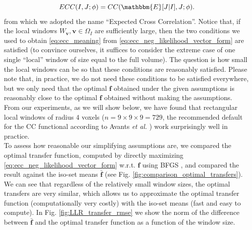 \begin{equation}\label{eq:ecc_meaning}
    ECC(I, J; \phi) = CC(\mathbbm{E}[J|I], J ; \phi).
\end{equation}
from which we adopted the name ``Expected Cross Correlation''. Notice that, if the local windows $W_{\mathbf{v}}, \mathbf{v}\in\Omega_{I}$ are sufficiently large, then the two conditions we used to obtain \eqref{eq:ecc_meaning} from \eqref{eq:ecc_neg_likelihood_vector_form} are satisfied (to convince ourselves, it suffices to consider the extreme case of one single ``local'' window of size equal to the full volume). The question is how small the local windows can be so that these conditions are reasonably satisfied. Please note that, in practice, we do not need these conditions to be satisfied everywhere, but we only need that the optimal $\mathbf{f}$ obtained under the given assumptions is reasonably close to the optimal $\mathbf{f}$ obtained without making the assumptions. From our experiments, as we will show below, we have found that rectangular local windows of radius $4$ voxels ($n=9\times 9\times 9 = 729$, the recommended default for the CC functional according to Avants {\it et al.} \cite{Avants2011}) work surprisingly well in practice.\\

To assess how reasonable our simplifying assumptions are, we compared the optimal transfer function, computed by directly maximizing \eqref{eq:ecc_neg_likelihood_vector_form} w.r.t. $\mathbf{f}$ using BFGS \cite{GVK502988711}, and compared the result against the iso-set means $\mathbf{\bar{f}}$ (see Fig. \ref{fig:comparison_optimal_transfers}). We can see that regardless of the relatively small window sizes, the optimal transfers are very similar, which allows us to approximate the optimal transfer function (computationally very costly) with the iso-set means (fast and easy to compute). In Fig. \ref{fig:LLR_transfer_rmse} we show the norm of the difference between $\mathbf{\bar{f}}$ and the optimal transfer function as a function of the window size. \\

